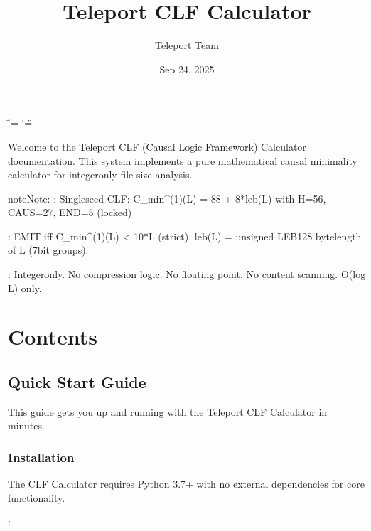 \documentclass[letterpaper,10pt,english]{sphinxmanual}
\title{Teleport CLF Calculator}
\date{Sep 24, 2025}
\author{Teleport Team}
\begin{document}
\ifdefined\shorthandoff
  \ifnum\catcode`\=\string=\active\shorthandoff{=}\fi
  \ifnum\catcode`\"=\active{}\fi
\fi

\pagestyle{empty}
\sphinxmaketitle
\pagestyle{plain}
\sphinxtableofcontents
\pagestyle{normal}
\label{\detokenize{index::doc}}


\sphinxAtStartPar
Welcome to the Teleport CLF (Causal Logic Framework) Calculator documentation. This system implements a pure mathematical causal minimality calculator for integer\sphinxhyphen{}only file size analysis.

\begin{sphinxadmonition}{note}{Note:}
\sphinxAtStartPar
{}: Single\sphinxhyphen{}seed CLF: C\_min\textasciicircum{}(1)(L) = 88 + 8*leb(L) with H=56, CAUS=27, END=5 (locked)

\sphinxAtStartPar
{}: EMIT iff C\_min\textasciicircum{}(1)(L) \textless{} 10*L (strict). leb(L) = unsigned LEB128 byte\sphinxhyphen{}length of L (7\sphinxhyphen{}bit groups).

\sphinxAtStartPar
{}: Integer\sphinxhyphen{}only. No compression logic. No floating point. No content scanning. O(log L) only.
\end{sphinxadmonition}


\chapter{Contents}
\label{\detokenize{index:contents}}
\sphinxstepscope


\section{Quick Start Guide}
\label{\detokenize{quickstart:quick-start-guide}}\label{\detokenize{quickstart::doc}}
\sphinxAtStartPar
This guide gets you up and running with the Teleport CLF Calculator in minutes.


\subsection{Installation}
\label{\detokenize{quickstart:installation}}
\sphinxAtStartPar
The CLF Calculator requires Python 3.7+ with no external dependencies for core functionality.

\sphinxAtStartPar
{}:

\begin{sphinxVerbatim}[commandchars=\\\{\}]
  
 
       
\end{sphinxVerbatim}
\end{document}
